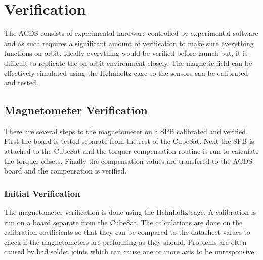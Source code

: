 
\chapter{Verification}

\label{ch:Verification}

The \ac{ACDS} consists of experimental hardware controlled by experimental software and as such requires a significant amount of verification to make sure everything functions on orbit. Ideally everything would be verified before launch but, it is difficult to replicate the on-orbit environment closely. The magnetic field can be effectively simulated using the Helmholtz cage so the sensors can be calibrated and tested. 

\section{Magnetometer Verification}

There are several steps to the magnetometer on a \ac{SPB} calibrated and verified. First the board is tested separate from the rest of the CubeSat. Next the \ac{SPB} is attached to the CubeSat and the torquer compensation routine is run to calculate the torquer offsets. Finally the compensation values are transfered to the \ac{ACDS} board and the compensation is verified.

\subsection{Initial Verification}

The magnetometer verification is done using the Helmholtz cage. A calibration is run on a board separate from the CubeSat. The calculations are done on the calibration coefficients so that they can be compared to the datasheet values to check if the magnetometers are preforming as they should. Problems are often caused by bad solder joints which can cause one or more axis to be unresponsive.

